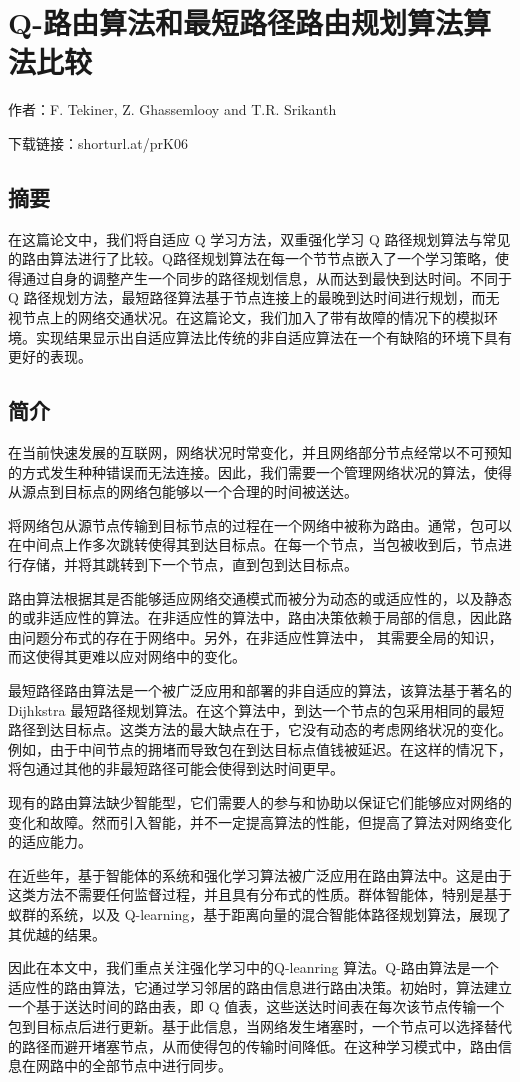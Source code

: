 \documentclass{standalone}
\begin{document}
\thesistranslationchinese

\section{Q-路由算法和最短路径路由规划算法算法比较}
作者：F. Tekiner, Z. Ghassemlooy and T.R. Srikanth\par
下载链接：shorturl.at/prK06
\subsection{摘要}
在这篇论文中，我们将自适应 Q 学习方法，双重强化学习 Q 路径规划算法与常见的路由算法进行了比较。Q路径规划算法在每一个节节点嵌入了一个学习策略，使得通过自身的调整产生一个同步的路径规划信息，从而达到最快到达时间。不同于 Q 路径规划方法，最短路径算法基于节点连接上的最晚到达时间进行规划，而无视节点上的网络交通状况。在这篇论文，我们加入了带有故障的情况下的模拟环境。实现结果显示出自适应算法比传统的非自适应算法在一个有缺陷的环境下具有更好的表现。
\subsection{简介}
在当前快速发展的互联网，网络状况时常变化，并且网络部分节点经常以不可预知的方式发生种种错误而无法连接。因此，我们需要一个管理网络状况的算法，使得从源点到目标点的网络包能够以一个合理的时间被送达。\par
将网络包从源节点传输到目标节点的过程在一个网络中被称为路由。通常，包可以在中间点上作多次跳转使得其到达目标点。在每一个节点，当包被收到后，节点进行存储，并将其跳转到下一个节点，直到包到达目标点。\par
路由算法根据其是否能够适应网络交通模式而被分为动态的或适应性的，以及静态的或非适应性的算法。在非适应性的算法中，路由决策依赖于局部的信息，因此路由问题分布式的存在于网络中。另外，在非适应性算法中， 其需要全局的知识，而这使得其更难以应对网络中的变化。\par
最短路径路由算法是一个被广泛应用和部署的非自适应的算法，该算法基于著名的 Dijhkstra 最短路径规划算法。在这个算法中，到达一个节点的包采用相同的最短路径到达目标点。这类方法的最大缺点在于，它没有动态的考虑网络状况的变化。例如，由于中间节点的拥堵而导致包在到达目标点值钱被延迟。在这样的情况下，将包通过其他的非最短路径可能会使得到达时间更早。\par
现有的路由算法缺少智能型，它们需要人的参与和协助以保证它们能够应对网络的变化和故障。然而引入智能，并不一定提高算法的性能，但提高了算法对网络变化的适应能力。\par
在近些年，基于智能体的系统和强化学习算法被广泛应用在路由算法中。这是由于这类方法不需要任何监督过程，并且具有分布式的性质。群体智能体，特别是基于蚁群的系统，以及 Q-learning，基于距离向量的混合智能体路径规划算法，展现了其优越的结果。\par
因此在本文中，我们重点关注强化学习中的Q-leanring 算法。Q-路由算法是一个适应性的路由算法，它通过学习邻居的路由信息进行路由决策。初始时，算法建立一个基于送达时间的路由表，即 Q 值表，这些送达时间表在每次该节点传输一个包到目标点后进行更新。基于此信息，当网络发生堵塞时，一个节点可以选择替代的路径而避开堵塞节点，从而使得包的传输时间降低。在这种学习模式中，路由信息在网路中的全部节点中进行同步。
\end{document}
